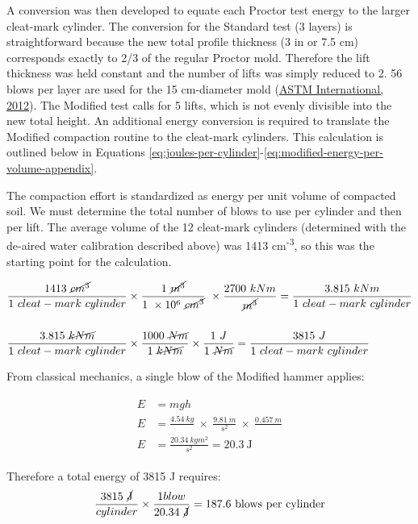 \documentclass[
  letterpaper,
  openany]{book}
\begin{document}
A conversion was then developed to equate each Proctor test energy to
the larger cleat-mark cylinder. The conversion for the Standard test
(3 layers) is straightforward because the new total profile thickness (3 in or 7.5 cm) corresponds exactly to 2/3 of the regular Proctor mold.
Therefore the lift thickness was held constant and the number of lifts was simply reduced to 2. 56 blows per layer are used for the 15 cm-diameter mold (\protect\hyperlink{ref-ASTMD698-12}{ASTM International, 2012}).
The Modified test calls for 5 lifts, which is not evenly divisible into the new total height.
An additional energy conversion is required to translate the Modified compaction routine to the cleat-mark cylinders.
This calculation is outlined below in Equations \eqref{eq:joules-per-cylinder}-\eqref{eq:modified-energy-per-volume-appendix}.

The compaction effort is standardized as energy per unit volume of compacted soil.
We must determine the total number of blows to use per cylinder and then per lift.
The average volume of the 12 cleat-mark cylinders (determined with the de-aired water calibration described above) was 1413 cm\textsuperscript{-3}, so this was the starting point for the calculation.

\begin{align} 
\frac{1413~\cancel{cm^3}}{1~cleat-mark~cylinder} &\times
\label{eq:joules-per-cylinder}
\frac{1~\cancel{m^3}}{1~\times10^6~\cancel{cm^3}}~\times \frac{2700~kNm}{\cancel{m^3}}  = \frac{3.815~kNm}{1~cleat-mark~cylinder} \\
\nonumber \\
\frac{3.815~\cancel{kNm}}{1~cleat-mark~cylinder} &\times \frac{1000~\cancel{Nm}}{1~\cancel{kNm}} \times \frac{1~J}{1~\cancel{Nm}} = \frac{3815~J}{1~cleat-mark~cylinder} 
\end{align}

From classical mechanics, a single blow of the Modified hammer applies:

\begin{align}
\begin{split}
E&=mgh \\
E&=\frac{4.54~kg}{}~\times~\frac{9.81~m}{s^2}~\times~\frac{0.457~m}{} \\
E&=\frac{20.34~kgm^2}{s^2} =20.3~\text{J}
\end{split}
\end{align}

Therefore a total energy of 3815 J requires:
\begin{equation}
\frac{3815~\text{\cancel{J}}}{cylinder}\times\frac{1 blow}{20.34~\text{\cancel{J}}}= \text{187.6 blows per cylinder}
\label{eq:modified-energy-per-volume-appendix}
\end{equation}
\end{document}
